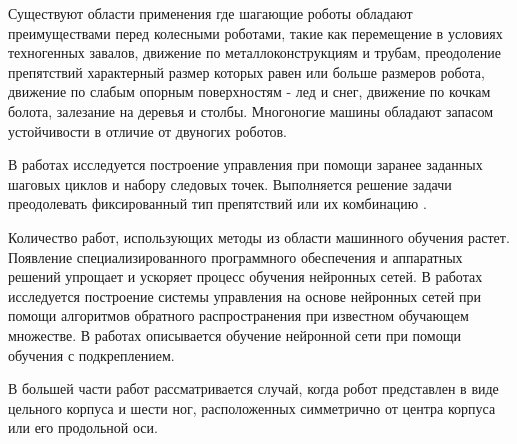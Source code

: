 {\actuality}
Существуют области применения где шагающие роботы обладают преимуществами перед колесными роботами, такие как перемещение в условиях техногенных завалов, движение по металлоконструкциям и трубам, преодоление препятствий характерный размер которых равен или больше размеров робота, движение по слабым опорным поверхностям - лед и снег, движение по кочкам болота, залезание на деревья и столбы. Многоногие машины обладают запасом устойчивости в отличие от двуногих роботов.

В работах \todo{[]} исследуется построение управления при помощи заранее заданных шаговых циклов и набору следовых точек. Выполняется решение задачи преодолевать фиксированный тип препятствий или их комбинацию . 

Количество работ, использующих методы из области машинного обучения растет. Появление специализированного программного обеспечения и аппаратных решений упрощает и ускоряет процесс обучения нейронных сетей. В работах \todo{[]} исследуется построение системы управления на основе нейронных сетей при помощи алгоритмов обратного распространения при известном обучающем множестве. В работах \todo{[]} описывается обучение нейронной сети при помощи обучения с подкреплением.

В большей части работ \todo{[]} рассматривается случай, когда робот представлен в виде цельного корпуса и шести ног, расположенных симметрично от центра корпуса или его продольной оси.



